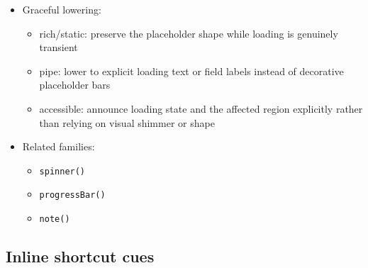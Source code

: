 \begin{itemize}
  \begin{itemize}
  \tightlist
  \item
    core
  \end{itemize}
\item
  Graceful lowering:

  \begin{itemize}
  \tightlist
  \item
    rich/static: preserve the placeholder shape while loading is genuinely transient
  \item
    pipe: lower to explicit loading text or field labels instead of decorative placeholder bars
  \item
    accessible: announce loading state and the affected region explicitly rather than relying on visual shimmer or shape
  \end{itemize}
\item
  Related families:

  \begin{itemize}
  \tightlist
  \item
    \texttt{s\allowbreak{}p\allowbreak{}i\allowbreak{}n\allowbreak{}n\allowbreak{}e\allowbreak{}r\allowbreak{}(\allowbreak{})}
  \item
    \texttt{p\allowbreak{}r\allowbreak{}o\allowbreak{}g\allowbreak{}r\allowbreak{}e\allowbreak{}s\allowbreak{}s\allowbreak{}B\allowbreak{}a\allowbreak{}r\allowbreak{}(\allowbreak{})}
  \item
    \texttt{n\allowbreak{}o\allowbreak{}t\allowbreak{}e\allowbreak{}(\allowbreak{})}
  \end{itemize}
\end{itemize}

\subsection{Inline shortcut cues}\label{record-019-inline-shortcut-cues}

